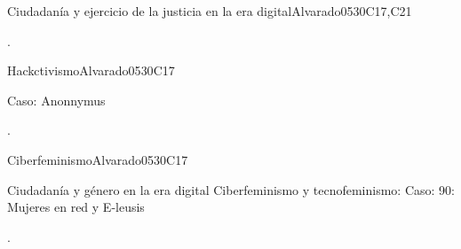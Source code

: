\begin{syllabus}
\begin{unit}{ Ciudadanía y ejercicio de la justicia en la era digital}{}{Alvarado05}{30}{C17,C21}
   \begin{learningoutcomes}
      \item .
   \end{learningoutcomes}
\end{unit}
\begin{unit}{ Hackctivismo}{}{Alvarado05}{30}{C17}
   \begin{topics}
      \item Caso: Anonnymus
   \end{topics}

   \begin{learningoutcomes}
      \item .
   \end{learningoutcomes}
\end{unit}
\begin{unit}{Ciberfeminismo}{}{Alvarado05}{30}{C17}
   \begin{topics}
      \item Ciudadanía y género en la era digital Ciberfeminismo y tecnofeminismo:  Caso: 90: Mujeres en red y E-leusis
   \end{topics}
   \begin{learningoutcomes}
      \item .
   \end{learningoutcomes}
\end{unit}



\begin{coursebibliography}
\end{coursebibliography}

\end{syllabus}
